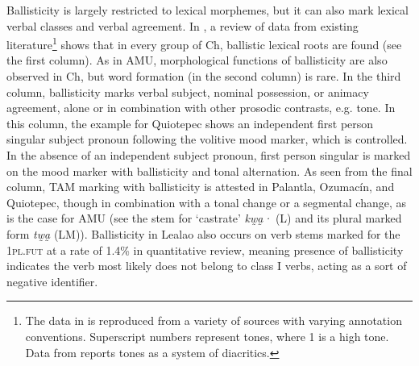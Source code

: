 \documentclass[output=paper]{langscibook}
\begin{document}
Ballisticity is largely restricted to lexical morphemes, but it can also mark lexical verbal classes and verbal agreement. In , a review of data from existing literature\footnote{The data in  is reproduced from a variety of sources with varying annotation conventions. Superscript numbers represent tones, where 1 is a high tone. Data from \citet{Rupp2012} reports tones as a system of diacritics.} shows that in every group of Ch, ballistic lexical roots are found (see the first column). As in AMU, morphological functions of ballisticity are also observed in Ch, but word formation (in the second column) is rare. In the third column, ballisticity marks verbal subject, nominal possession, or animacy agreement, alone or in combination with other prosodic contrasts, e.g. tone. In this column, the example for Quiotepec shows an independent first person singular subject pronoun following the volitive mood marker, which is controlled. In the absence of an independent subject pronoun, first person singular is marked on the mood marker with ballisticity and tonal alternation. As seen from the final column, TAM marking with ballisticity is attested in Palantla, Ozumacín, and Quiotepec, though in combination with a tonal change or a segmental change, as is the case for AMU (see the stem for ‘castrate’ \textit{kw̰a̰·} (L) and its plural marked form \textit{tw̰a̰} (LM)). Ballisticity in Lealao also occurs on verb stems marked for the 1\textsc{pl}.\textsc{fut} at a rate of 1.4\% in  quantitative review, meaning presence of ballisticity indicates the verb most likely does not belong to class I verbs, acting as a sort of negative identifier.
\end{document}
